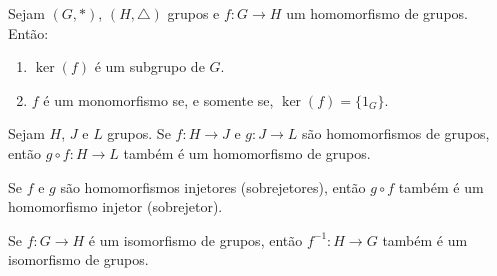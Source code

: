 \documentclass{beamer}
\begin{document}
    \begin{frame}
        \begin{proposicao}
            Sejam $(G, *)$, \pause $(H, \triangle)$ grupos \pause e $f : G \to H$ um homomorfismo de grupos. \pause Então: \pause
            \vspace{.5cm}

            \begin{enumerate}[label={\roman*})]
                \item $\ker(f)$ é um subgrupo de $G$. \pause

                \vspace{.5cm}

                \item $f$ é um monomorfismo se, e somente se, $\ker(f) = \{1_G\}$.

                \vspace{.5cm}
            \end{enumerate}
        \end{proposicao}
    \end{frame}

    \begin{frame}
        \begin{proposicao}
            Sejam $H$, $J$ e $L$ grupos. \pause Se $f : H \to J$ \pause e $g : J \to L$ \pause são homomorfismos de grupos, \pause então $g \circ f : H \to L$ \pause também é um homomorfismo de grupos.
        \end{proposicao}
        \vspace{2cm}
    \end{frame}

    \begin{frame}
        \begin{corolario}
            Se $f$ e $g$ são homomorfismos \pause injetores \pause (sobrejetores), então $g \circ f$ \pause também é um homomorfismo injetor \pause (sobrejetor).
        \end{corolario}
        \vspace{2cm}
    \end{frame}

    \begin{frame}
        \begin{proposicao}
            Se $f : G \to H$ é um isomorfismo de grupos, \pause então $f^{-1} : H \to G$ \pause também é um isomorfismo de grupos.
        \end{proposicao}
    \end{frame}
\end{document}
